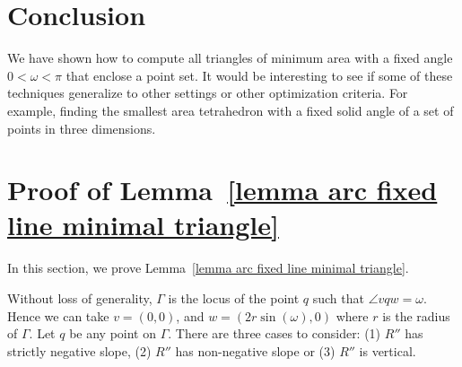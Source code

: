 \documentclass[11pt, oneside]{article}
\begin{document}
\section{Conclusion}
\label{section conclusion}


We have shown how to compute 
all triangles of minimum area 
with a fixed angle $0<\omega<\pi$ 
that enclose a point set.
It would be interesting to see 
if some of these techniques generalize 
to other settings or other optimization criteria.
For example,
finding the smallest area tetrahedron with a fixed solid angle
of a set of points in three dimensions.






\appendix

\section{Proof of Lemma~\ref{lemma arc fixed line minimal triangle}}
\label{appendix proof lemma}

In this section,
we prove Lemma~\ref{lemma arc fixed line minimal triangle}.

\proof
Without loss of generality,
$\Gamma$ is the locus of the point $q$
such that $\angle vqw = \omega$.
Hence we can take
$v=(0,0)$,
and $w=(2r\sin(\omega),0)$
where $r$ is the radius of $\Gamma$.
Let $q$ be any point on $\Gamma$.
There are three cases to consider:
(1) $R''$ has strictly negative slope,
(2) $R''$ has non-negative slope
or (3) $R''$ is vertical.
\end{document}
